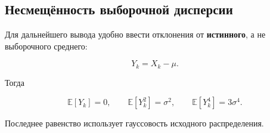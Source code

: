 \documentclass[
  russian,
  12pt,
  a4paper,
  a4paper,
  openany]{scrbook}
\begin{document}
\subsection{Несмещённость выборочной
дисперсии}\label{ux43dux435ux441ux43cux435ux449ux451ux43dux43dux43eux441ux442ux44c-ux432ux44bux431ux43eux440ux43eux447ux43dux43eux439-ux434ux438ux441ux43fux435ux440ux441ux438ux438}

Для дальнейшего вывода удобно ввести отклонения от \textbf{истинного}, а
не выборочного среднего:

\[
Y_k=X_k-\mu.
\]

Тогда

\[
\mathbb E[Y_k]=0,
\qquad
\mathbb E[Y_k^2]=\sigma^2,
\qquad
\mathbb E[Y_k^4]=3\sigma^4.
\]

Последнее равенство использует гауссовость исходного распределения.
\end{document}

